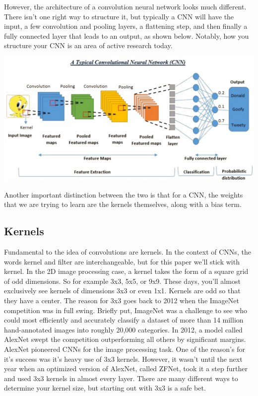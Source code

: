 \documentclass{article}
\begin{document}
        However, the architecture of a convolution neural network looks much different. There isn't one right way to structure it, but typically a CNN will have the input, a few convolution and pooling layers, a flattening step, and then finally a fully connected layer that leads to an output, as shown below. Notably, how you structure your CNN is an area of active research today.
        
        \begin{center}
            \includegraphics[scale=0.3]{images/CNN.jpg}
        \end{center}
        
        Another important distinction between the two is that for a CNN, the weights that we are trying to learn are the kernels themselves, along with a bias term.

    \subsection{Kernels}
        Fundamental to the idea of convolutions are kernels. In the context of CNNs, the words kernel and filter are interchangeable, but for this paper we'll stick with kernel. In the 2D image processing case, a kernel takes the form of a square grid of odd dimensions. So for example 3x3, 5x5, or 9x9. These days, you'll almost exclusively see kernels of dimensions 3x3 or even 1x1. Kernels are odd so that they have a center. The reason for 3x3 goes back to 2012 when the ImageNet competition was in full swing. Briefly put, ImageNet was a challenge to see who could most efficiently and accurately classify a dataset of more than 14 million hand-annotated images into roughly 20,000 categories. In 2012, a model called AlexNet swept the competition outperforming all others by significant margins. AlexNet pioneered CNNs for the image processing task. One of the reason's for it's success was it's heavy use of 3x3 kernels. However, it wasn't until the next year when an optimized version of AlexNet, called ZFNet, took it a step further and used 3x3 kernels in almost every layer. There are many different ways to determine your kernel size, but starting out with 3x3 is a safe bet.
        
\end{document}

